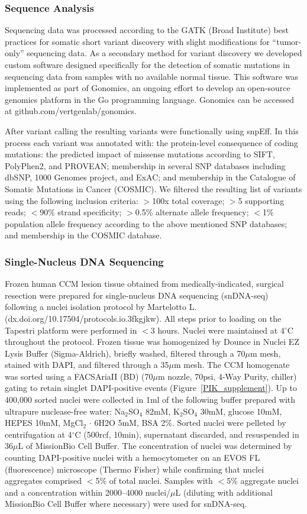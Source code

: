 \subsubsection{Sequence Analysis}
Sequencing data was processed according to the GATK (Broad Institute) best practices for somatic short variant discovery with slight modifications for “tumor-only” sequencing data. As a secondary method for variant discovery we developed custom software designed specifically for the detection of somatic mutations in sequencing data from samples with no available normal tissue. This software was implemented as part of Gonomics, an ongoing effort to develop an open-source genomics platform in the Go programming language. Gonomics can be accessed at github.com/vertgenlab/gonomics. 

After variant calling the resulting variants were functionally using snpEff. In this process each variant was annotated with: the protein-level consequence of coding mutations: the predicted impact of missense mutations according to SIFT, PolyPhen2, and PROVEAN; membership in several SNP databases including dbSNP, 1000 Genomes project, and ExAC; and membership in the Catalogue of Somatic Mutations in Cancer (COSMIC). We filtered the resulting list of variants using the following inclusion criteria: $>$100x total coverage; $>$5 supporting reads; $<$90\% strand specificity; $>$0.5\% alternate allele frequency; $<$1\% population allele frequency according to the above mentioned SNP databases; and membership in the COSMIC database. 

\subsubsection{Single-Nucleus DNA Sequencing}
Frozen human CCM lesion tissue obtained from medically-indicated, surgical resection were prepared for single-nucleus DNA sequencing (snDNA-seq) following a nuclei isolation protocol by Martelotto L. (dx.doi.org/10.17504/protocols.io.3fkgjkw). All steps prior to loading on the Tapestri platform were performed in $<$3 hours. Nuclei were maintained at 4$^{\circ}$C throughout the protocol. Frozen tissue was homogenized by Dounce in Nuclei EZ Lysis Buffer (Sigma-Aldrich), briefly washed, filtered through a 70$\mu$m mesh, stained with DAPI, and filtered through a 35$\mu$m mesh. The CCM homogenate was sorted using a FACSAriaII (BD) (70$\mu$m nozzle, 70psi, 4-Way Purity, chiller) gating to retain singlet DAPI-positive events (Figure~\ref{PIK_supplement}). Up to 400,000 sorted nuclei were collected in 1ml of the following buffer prepared with ultrapure nuclease-free water: Na$_2$SO$_4$ 82mM, K$_2$SO$_4$ 30mM, glucose 10mM, HEPES 10mM, MgCl$_2$ $\cdot$ 6H2O 5mM, BSA 2\%. Sorted nuclei were pelleted by centrifugation at 4$^{\circ}$C (500rcf, 10min), supernatant discarded, and resuspended in 36$\mu$L of MissionBio Cell Buffer. The concentration of nuclei was determined by counting DAPI-positive nuclei with a hemocytometer on an EVOS FL (fluorescence) microscope (Thermo Fisher) while confirming that nuclei aggregates comprised $<$5\% of total nuclei. Samples with $<$5\% aggregate nuclei and a concentration within 2000--4000 nuclei/$\mu$L (diluting with additional MissionBio Cell Buffer where necessary) were used for snDNA-seq.

